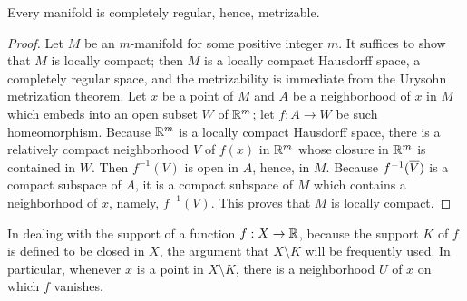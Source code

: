 \begin{prop}
    Every manifold is completely regular, hence, metrizable.
\end{prop}
\begin{proof}
    Let $M$ be an $m$-manifold for some positive integer $m$.
    It suffices to show that $M$ is locally compact; then $M$ is a locally compact Hausdorff space, a completely regular space, and the metrizability is immediate from the Urysohn metrization theorem.
    Let $x$ be a point of $M$ and $A$ be a neighborhood of $x$ in $M$ which embeds into an open subset $W$ of ${\mathbb{R}}^m$; let $f: A\rightarrow W$ be such homeomorphism.
    Because ${\mathbb{R}}^m$ is a locally compact Hausdorff space, there is a relatively compact neighborhood $V$ of $f(x)$ in ${\mathbb{R}}^m$ whose closure in ${\mathbb{R}}^m$ is contained in $W$.
    Then $f^{-1}(V)$ is open in $A$, hence, in $M$.
    Because $f^{-1}(\overline{V})$ is a compact subspace of $A$, it is a compact subspace of $M$ which contains a neighborhood of $x$, namely, $f^{-1}(V)$.
    This proves that $M$ is locally compact.
\end{proof}

In dealing with the support of a function $f: X\rightarrow {\mathbb{R}}$, because the support $K$ of $f$ is defined to be closed in $X$, the argument that $X\setminus K$ will be frequently used.
In particular, whenever $x$ is a point in $X\setminus K$, there is a neighborhood $U$ of $x$ on which $f$ vanishes.

